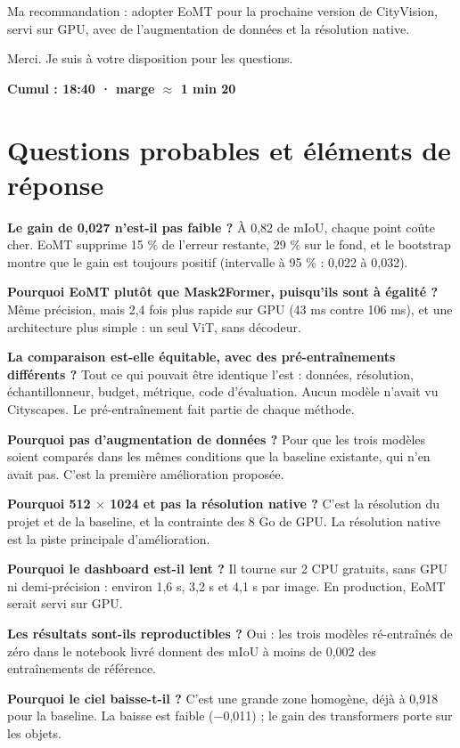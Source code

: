 \documentclass[11pt,a4paper]{article}
\newcommand{\cumul}[1]{\par{\hfill\small\color{accent}\bfseries #1}\par}
\begin{document}
Ma recommandation : adopter EoMT pour la prochaine version de CityVision, servi sur GPU, avec de l'augmentation de données et la résolution native.

Merci. Je suis à votre disposition pour les questions.

\cumul{Cumul : 18:40 · marge $\approx$ 1 min 20}

\medskip{\color{linec}\rule{\linewidth}{0.5pt}}\medskip

\section*{Questions probables et éléments de réponse}

\textbf{Le gain de 0,027 n'est-il pas faible ?}
À 0,82 de mIoU, chaque point coûte cher. EoMT supprime 15 \% de l'erreur restante, 29 \% sur le fond, et le bootstrap montre que le gain est toujours positif (intervalle à 95 \% : 0,022 à 0,032).

\textbf{Pourquoi EoMT plutôt que Mask2Former, puisqu'ils sont à égalité ?}
Même précision, mais 2,4 fois plus rapide sur GPU (43 ms contre 106 ms), et une architecture plus simple : un seul ViT, sans décodeur.

\textbf{La comparaison est-elle équitable, avec des pré-entraînements différents ?}
Tout ce qui pouvait être identique l'est : données, résolution, échantillonneur, budget, métrique, code d'évaluation. Aucun modèle n'avait vu Cityscapes. Le pré-entraînement fait partie de chaque méthode.

\textbf{Pourquoi pas d'augmentation de données ?}
Pour que les trois modèles soient comparés dans les mêmes conditions que la baseline existante, qui n'en avait pas. C'est la première amélioration proposée.

\textbf{Pourquoi 512 $\times$ 1024 et pas la résolution native ?}
C'est la résolution du projet et de la baseline, et la contrainte des 8 Go de GPU. La résolution native est la piste principale d'amélioration.

\textbf{Pourquoi le dashboard est-il lent ?}
Il tourne sur 2 CPU gratuits, sans GPU ni demi-précision : environ 1,6 s, 3,2 s et 4,1 s par image. En production, EoMT serait servi sur GPU.

\textbf{Les résultats sont-ils reproductibles ?}
Oui : les trois modèles ré-entraînés de zéro dans le notebook livré donnent des mIoU à moins de 0,002 des entraînements de référence.

\textbf{Pourquoi le ciel baisse-t-il ?}
C'est une grande zone homogène, déjà à 0,918 pour la baseline. La baisse est faible ($-$0,011) ; le gain des transformers porte sur les objets.
\end{document}
